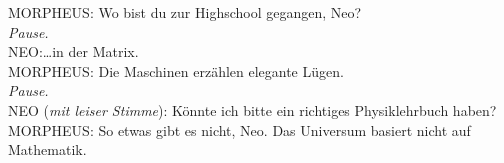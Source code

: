 \begin{playdialog}
MORPHEUS: Wo bist du zur Highschool gegangen, Neo?\\

\emph{Pause.}\\

NEO:…in der Matrix.\\

MORPHEUS: Die Maschinen erzählen elegante Lügen.\\

\emph{Pause.}\\

NEO (\emph{mit leiser Stimme}): Könnte ich bitte ein richtiges Physiklehrbuch haben?\\

MORPHEUS: So etwas gibt es nicht, Neo. Das Universum basiert nicht auf Mathematik.\\

\end{playdialog}

